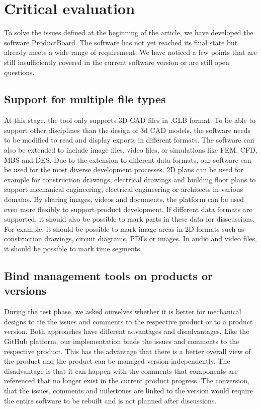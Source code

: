 \section{Critical evaluation}
\label{sec:evaluation}
To solve the issues defined at the beginning of the article, we have developed the software ProductBoard. The software has not yet reached its final state but already meets a wide range of requirement. We have noticed a few points that are still insufficiently covered in the current software version or are still open questions.

\subsection*{Support for multiple file types}
At this stage, the tool only supports 3D CAD files in .GLB format. To be able to support other disciplines than the design of 3d CAD models, the software needs to be modified to read and display exports in different formats. The software can also be extended to include image files, video files, or simulations like FEM, CFD, MBS and DES. 
Due to the extension to different data formats, our software can be used for the most diverse development processes. 
2D plans can be used for example for construction drawings, electrical drawings and building floor plans to support mechanical engineering, electrical engineering or architects in various domains.
By sharing images, videos and documents, the platform can be used even more flexibly to support product development.
If different data formats are supported, it should also be possible to mark parts in these data for disscussions.
For example, it should be possible to mark image areas in 2D formats such as construction drawings, circuit diagrams, PDFs or images. 
In audio and video files, it should be possible to mark time segments.

\subsection*{Bind management tools on products or versions}
During the test phase, we asked ourselves whether it is better for mechanical designs to tie the issues and comments to the respective product or to a product version. Both approaches have different advantages and disadvantages. Like the GitHub platform, our implementation binds the issues and comments to the respective product. This has the advantage that there is a better overall view of the product and the product can be managed version-independently. The disadvantage is that it can happen with the comments that components are referenced that no longer exist in the current product progress. The conversion, that the issues, comments and milestones are linked to the version would require the entire software to be rebuilt and is not planned after discussions.


